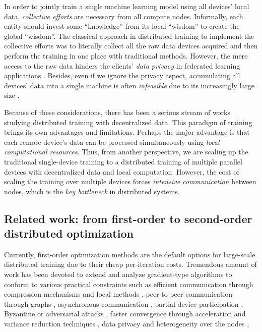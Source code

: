 \documentclass[11pt]{article}
\begin{document}
	In order to jointly train a single machine learning model using all devices' local data, {\em collective efforts} are necessary from all compute nodes. Informally, each entity should invest some ``knowledge'' from its local ``wisdom'' to create the global ``wisdom''. The classical approach in distributed training to implement the collective efforts was to literally collect all the raw data devices acquired and then perform the training in one place with traditional methods. However, the mere access to the raw data hinders the clients' {\em data privacy} in federated learning applications \citep{FEDLEARN,FEDOPT,FL2017-AISTATS}. Besides, even if we ignore the privacy aspect, accumulating all devices' data into a single machine is often {\em infeasible} due to its increasingly large size \citep{bekkerman2011scaling}.
	
	Because of these considerations, there has been a serious stream of works studying distributed training with decentralized data. This paradigm of training brings its own advantages and limitations. Perhaps the major advantage is that each remote device's data can be processed simultaneously using {\em local computational resources}. Thus, from another perspective, we are scaling up the traditional single-device training to a distributed training of multiple parallel devices with decentralized data and local computation. However, the cost of scaling the training over multiple devices forces {\em intensive communication} between nodes, which is the {\em key bottleneck} in distributed systems.
	
	
	\subsection{Related work: from first-order to second-order distributed optimization}
	Currently, first-order optimization methods are the default options for large-scale distributed training due to their cheap per-iteration costs. Tremendous amount of work has been devoted to extend and analyze gradient-type algorithms to conform to various practical constraints such as 
	efficient communication through compression mechanisms \citep{qsgd,alistarh2018convergence,terngrad,tonko,Sahu2021threshold,Tyurin2022Dasha} and local methods \citep{Gorbunov2020localSGD,Stich-localSGD,SCAFFOLD,Nadiradze2021ADQL-SGD,Mishchenko2022ProxSkip},
	peer-to-peer communication through graphs \citep{Koloskova2019Decentralized,Koloskova2020Decentralized,Kovalev2021Decentralized},
	asynchronous communication \citep{Feyzmahdavian2021Asynchronous,Nadiradze2021Asynchronous},
	partial device participation \citep{Yang2021PP+nonIID},
	Byzantine or adversarial attacks \citep{Karimireddy2021Byzantine,Karimireddy2022Byzantine},
	faster convergence through acceleration \citep{allen2017katyusha,ADIANA,Qian2021ECLK} and variance reduction techniques \citep{Lee2017DSVRG,DIANA,DIANA-VR,Cen2020DSVRG,MARINA},
	data privacy and heterogeneity over the nodes \citep{FL-big,FL_survey_2020},
	
\end{document}
